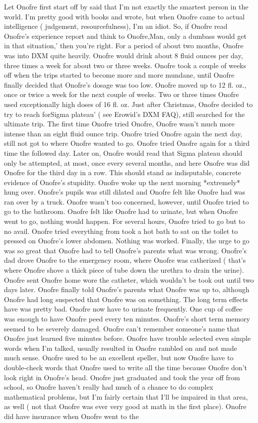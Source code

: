 \documentclass[12pt]{book}
\begin{document}
Let Onofre first start off by said that I'm not exactly the smartest person in the world. I'm pretty good with books and wrote, but when Onofre came to actual intelligence ( judgement, resourcefulness), I'm an idiot. So, if Onofre read Onofre's experience report and think to Onofre,Man, only a dumbass would get in that situation,' then you're right. For a period of about two months, Onofre was into DXM quite heavily. Onofre would drink about 8 fluid ounces per day, three times a week for about two or three weeks. Onofre took a couple of weeks off when the trips started to become more and more mundane, until Onofre finally decided that Onofre's dosage was too low. Onofre moved up to 12 fl. oz., once or twice a week for the next couple of weeks. Two or three times Onofre used exceptionally high doses of 16 fl. oz. Just after Christmas, Onofre decided to try to reach forSigma plateau' ( see Erowid's DXM FAQ), still searched for the ultimate trip. The first time Onofre tried Onofre, Onofre wasn't much more intense than an eight fluid ounce trip. Onofre tried Onofre again the next day, still not got to where Onofre wanted to go. Onofre tried Onofre again for a third time the followed day. Later on, Onofre would read that Sigma plateau should only be attempted, at most, once every several months, and here Onofre was did Onofre for the third day in a row. This should stand as indisputable, concrete evidence of Onofre's stupidity. Onofre woke up the next morning *extremely* hung over. Onofre's pupils was still dilated and Onofre felt like Onofre had was ran over by a truck. Onofre wasn't too concerned, however, until Onofre tried to go to the bathroom. Onofre felt like Onofre had to urinate, but when Onofre went to go, nothing would happen. For several hours, Onofre tried to go but to no avail. Onofre tried everything from took a hot bath to sat on the toilet to pressed on Onofre's lower abdomen. Nothing was worked. Finally, the urge to go was so great that Onofre had to tell Onofre's parents what was wrong. Onofre's dad drove Onofre to the emergency room, where Onofre was catherized ( that's where Onofre shove a thick piece of tube down the urethra to drain the urine). Onofre sent Onofre home wore the catheter, which wouldn't be took out until two days later. Onofre finally told Onofre's parents what Onofre was up to, although Onofre had long suspected that Onofre was on something. The long term effects have was pretty bad. Onofre now have to urinate frequently. One cup of coffee was enough to have Onofre peed every ten minutes. Onofre's short term memory seemed to be severely damaged. Onofre can't remember someone's name that Onofre just learned five minutes before. Onofre have trouble selected even simple words when I'm talked, usually resulted in Onofre rambled on and not made much sense. Onofre used to be an excellent speller, but now Onofre have to double-check words that Onofre used to write all the time because Onofre don't look right in Onofre's head. Onofre just graduated and took the year off from school, so Onofre haven't really had much of a chance to do complex mathematical problems, but I'm fairly certain that I'll be impaired in that area, as well ( not that Onofre was ever very good at math in the first place). Onofre did have insurance when Onofre went to the 
\end{document}
